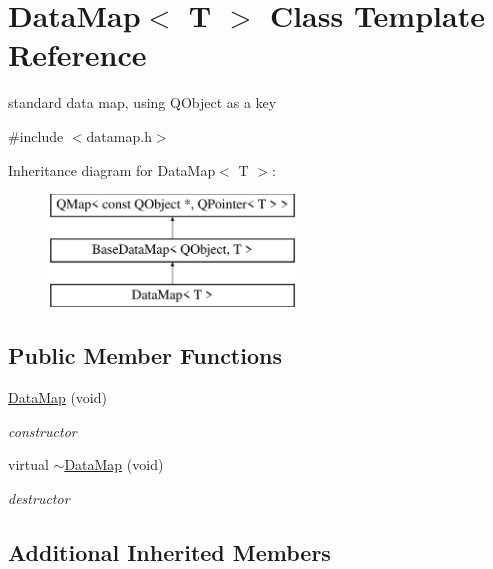 \hypertarget{class_data_map}{}\section{Data\+Map$<$ T $>$ Class Template Reference}
\label{class_data_map}


standard data map, using Q\+Object as a key  




{\ttfamily \#include $<$datamap.\+h$>$}

Inheritance diagram for Data\+Map$<$ T $>$\+:\begin{figure}[H]
\begin{center}
\leavevmode
\includegraphics[height=3.000000cm]{class_data_map}
\end{center}
\end{figure}
\subsection*{Public Member Functions}
\begin{DoxyCompactItemize}
\item 
\mbox{\label{class_data_map_a185eee2a246167582db63049cabec995}} 
\hyperlink{class_data_map_a185eee2a246167582db63049cabec995}{Data\+Map} (void)
\begin{DoxyCompactList}\small\item\em constructor \end{DoxyCompactList}\item 
\mbox{\label{class_data_map_aae76d57180e69355d1dc483404f2b106}} 
virtual \hyperlink{class_data_map_aae76d57180e69355d1dc483404f2b106}{$\sim$\+Data\+Map} (void)
\begin{DoxyCompactList}\small\item\em destructor \end{DoxyCompactList}\end{DoxyCompactItemize}
\subsection*{Additional Inherited Members}


